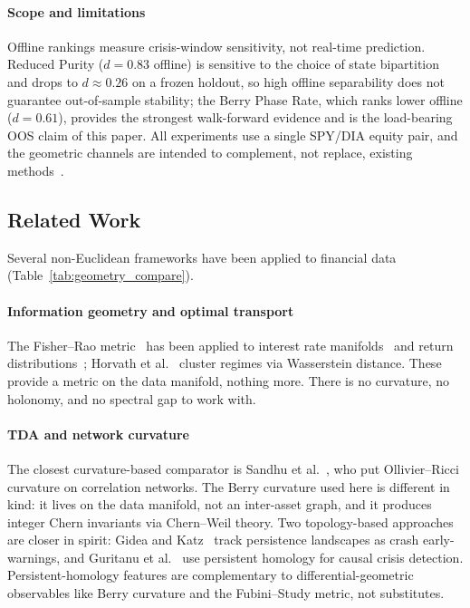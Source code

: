 \documentclass[3p]{elsarticle}
\begin{document}
\paragraph{Scope and limitations}
Offline rankings measure crisis-window sensitivity, not real-time
prediction.  Reduced Purity ($d = 0.83$ offline) is sensitive to
the choice of state bipartition and drops to $d \approx 0.26$ on a
frozen holdout, so high offline separability does not guarantee
out-of-sample stability; the Berry Phase Rate, which ranks lower
offline ($d = 0.61$), provides the strongest walk-forward evidence
and is the load-bearing OOS claim of this paper.  All experiments
use a single SPY/DIA equity pair, and the geometric channels are
intended to complement, not replace, existing
methods~\cite{timmermann2006,bates_granger1969}.

\subsection{Related Work}\label{subsec:related}

Several non-Euclidean frameworks have been applied to financial data
(Table~\ref{tab:geometry_compare}).

\paragraph{Information geometry and optimal transport}
The Fisher--Rao metric~\cite{amari_nagaoka2000} has been applied to
interest rate manifolds~\cite{brody_hughston2001} and return
distributions~\cite{taylor2019}; Horvath et al.~\cite{horvath2024}
cluster regimes via Wasserstein distance.  These provide a metric on
the data manifold, nothing more.  There is no curvature, no holonomy, and no
spectral gap to work with.

\paragraph{TDA and network curvature}
The closest curvature-based comparator is Sandhu et
al.~\cite{sandhu2016}, who put Ollivier--Ricci curvature on
correlation networks.  The Berry curvature used here is different in
kind: it lives on the data manifold, not an inter-asset graph, and it
produces integer Chern invariants via Chern--Weil theory.  Two
topology-based approaches are closer in spirit: Gidea and
Katz~\cite{gidea_katz2018} track persistence landscapes as crash
early-warnings, and Guritanu et al.~\cite{guritanu2025} use persistent
homology for causal crisis detection.  Persistent-homology features
are complementary to differential-geometric observables like Berry
curvature and the Fubini--Study metric, not substitutes.
\end{document}
